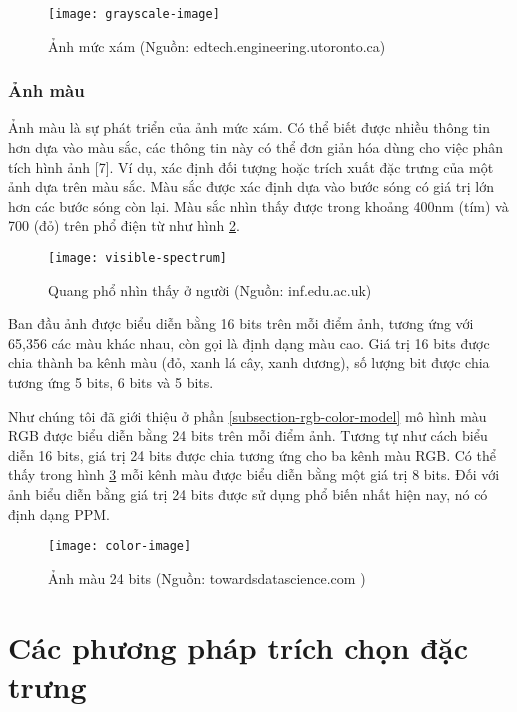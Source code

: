 \begin{figure}[h]
	\centering
	\texttt{[image: grayscale-image]}
	\caption[Ảnh mức xám]{Ảnh mức xám (Nguồn: edtech.engineering.utoronto.ca)}
	\label{fig:2.7}
\end{figure}

\subsubsection{Ảnh màu}
Ảnh màu là sự phát triển của ảnh mức xám. Có thể biết được nhiều thông tin hơn dựa vào màu sắc, các thông tin này có thể đơn giản hóa dùng cho việc phân tích hình ảnh [7]. Ví dụ, xác định đối tượng hoặc trích xuất đặc trưng của một ảnh dựa trên màu sắc. Màu sắc được xác định dựa vào bước sóng có giá trị lớn hơn các bước sóng còn lại. Màu sắc nhìn thấy được trong khoảng 400nm (tím) và 700 (đỏ) trên phổ điện từ như hình \ref{fig:2.8}.\par

\begin{figure}[!htp]
	\centering
	\texttt{[image: visible-spectrum]}
	\caption[Quang phổ nhìn thấy ở người]{Quang phổ nhìn thấy ở người (Nguồn: inf.edu.ac.uk)}
	\label{fig:2.8}
\end{figure}

Ban đầu ảnh được biểu diễn bằng 16 bits trên mỗi điểm ảnh, tương ứng với 65,356 các màu khác nhau, còn gọi là định dạng màu cao. Giá trị 16 bits được chia thành ba kênh màu (đỏ, xanh lá cây, xanh dương), số lượng bit được chia tương ứng 5 bits, 6 bits và 5 bits.\par

Như chúng tôi đã giới thiệu ở phần \ref{subsection-rgb-color-model} mô hình màu RGB được biểu diễn bằng 24 bits trên mỗi điểm ảnh. Tương tự như cách biểu diễn 16 bits, giá trị 24 bits được chia tương ứng cho ba kênh màu RGB. Có thể thấy trong hình \ref{fig:2.9} mỗi kênh màu được biểu diễn bằng một giá trị 8 bits. Đối với ảnh biểu diễn bằng giá trị 24 bits được sử dụng phổ biến nhất hiện nay, nó có định dạng PPM.\par

\begin{figure}[!htp]
	\centering
	\texttt{[image: color-image]}
	\caption[Ảnh màu 24 bits]{Ảnh màu 24 bits (Nguồn: towardsdatascience.com )}
	\label{fig:2.9}
\end{figure}


\section{Các phương pháp trích chọn đặc trưng}
